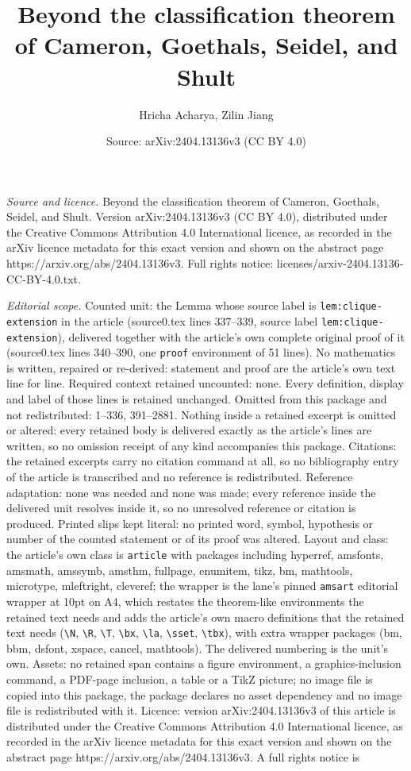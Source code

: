 \documentclass[10pt,a4paper]{amsart}
\title[Beyond the classification theorem of Cameron, Goethals, Seid]{Beyond the classification theorem of Cameron, Goethals, Seidel, and Shult}
\author{Hricha Acharya, Zilin Jiang}
\date{Source: arXiv:2404.13136v3 (CC BY 4.0)}
\begin{document}
\maketitle

\noindent\emph{Source and licence.} Beyond the classification theorem of Cameron, Goethals, Seidel, and Shult. Version arXiv:2404.13136v3 (CC BY 4.0), distributed under the Creative Commons Attribution 4.0 International licence, as recorded in the arXiv licence metadata for this exact version and shown on the abstract page https://arxiv.org/abs/2404.13136v3. Full rights notice: licenses/arxiv-2404.13136-CC-BY-4.0.txt.\par\smallskip

\noindent\textit{Editorial scope.} Counted unit: the Lemma whose source label is \texttt{lem:clique-extension} in the article (source0.tex lines 337--339, source label \texttt{lem:clique-extension}), delivered together with the article's own complete original proof of it (source0.tex lines 340--390, one \texttt{proof} environment of 51 lines). No mathematics is written, repaired or re-derived: statement and proof are the article's own text line for line. Required context retained uncounted: none. Every definition, display and label of those lines is retained unchanged. Omitted from this package and not redistributed: 1--336, 391--2881. Nothing inside a retained excerpt is omitted or altered: every retained body is delivered exactly as the article's lines are written, so no omission receipt of any kind accompanies this package. Citations: the retained excerpts carry no citation command at all, so no bibliography entry of the article is transcribed and no reference is redistributed. Reference adaptation: none was needed and none was made; every reference inside the delivered unit resolves inside it, so no unresolved reference or citation is produced. Printed slips kept literal: no printed word, symbol, hypothesis or number of the counted statement or of its proof was altered. Layout and class: the article's own class is \texttt{article} with packages including hyperref, amsfonts, amsmath, amssymb, amsthm, fullpage, enumitem, tikz, bm, mathtools, microtype, mleftright, cleveref; the wrapper is the lane's pinned \texttt{amsart} editorial wrapper at 10pt on A4, which restates the theorem-like environments the retained text needs and adds the article's own macro definitions that the retained text needs (\texttt{\textbackslash N}, \texttt{\textbackslash R}, \texttt{\textbackslash T}, \texttt{\textbackslash bx}, \texttt{\textbackslash la}, \texttt{\textbackslash sset}, \texttt{\textbackslash tbx}), with extra wrapper packages (bm, bbm, dsfont, xspace, cancel, mathtools). The delivered numbering is the unit's own. Assets: no retained span contains a figure environment, a graphics-inclusion command, a PDF-page inclusion, a table or a TikZ picture; no image file is copied into this package, the package declares no asset dependency and no image file is redistributed with it. Licence: version arXiv:2404.13136v3 of this article is distributed under the Creative Commons Attribution 4.0 International licence, as recorded in the arXiv licence metadata for this exact version and shown on the abstract page https://arxiv.org/abs/2404.13136v3. A full rights notice is 
\end{document}
